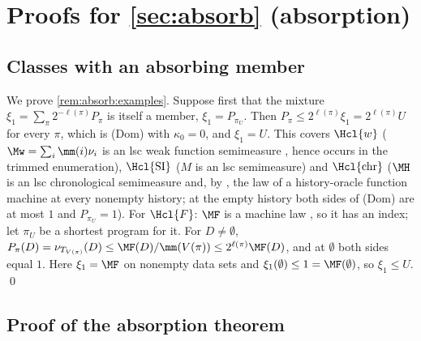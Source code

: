 \section{Proofs for \texorpdfstring{\cref{sec:absorb}}{Section \ref*{sec:absorb}} (absorption)}\label{app:absorb}

\subsection{Classes with an absorbing member}\label{app:absorb:examples}

We prove \cref{rem:absorb:examples}. Suppose first that the mixture $\xi_1=\sum_\pi2^{-\ell(\pi)}P_\pi$ is itself a member, $\xi_1=P_{\pi_U}$. Then $P_\pi\le2^{\ell(\pi)}\xi_1=2^{\ell(\pi)}U$ for every $\pi$, which is (Dom) with $\kappa_0=0$, and $\xi_1=U$. This covers $\Hcl{w}$ ($\Mw=\sum_i\mm(i)\nu_i$ is an lsc weak function semimeasure \citep[Theorem~3.11]{claudeSFI2026fundamentals}, hence occurs in the trimmed enumeration), $\Hcl{\mathrm{SI}}$ ($M$ is an lsc semimeasure) and $\Hcl{\mathrm{chr}}$ ($\MH$ is an lsc chronological semimeasure \citep[Corollary~6.17]{claudeSFI2026fundamentals} and, by \citet[Theorem~6.16]{claudeSFI2026fundamentals}, the law of a history-oracle function machine at every nonempty history; at the empty history both sides of (Dom) are at most $1$ and $P_{\pi_U}=1$). For $\Hcl{F}$: $\MF$ is a machine law \citep[Theorem~3.8]{claudeSFI2026fundamentals}, so it has an index; let $\pi_U$ be a shortest program for it. For $D\ne\emptyset$, $P_\pi(D)=\nu_{T_{V(\pi)}}(D)\le\MF(D)/\mm(V(\pi))\le2^{\ell(\pi)}\MF(D)$, and at $\emptyset$ both sides equal $1$. Here $\xi_1=\MF$ on nonempty data sets and $\xi_1(\emptyset)\le1=\MF(\emptyset)$, so $\xi_1\le U$. \qed%

\subsection{Proof of the absorption theorem}\label{app:absorb:absorption}

